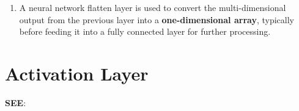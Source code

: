 \begin{enumerate}
    \item A neural network flatten layer is used to convert the multi-dimensional output from the previous layer into a \textbf{one-dimensional array}, typically before feeding it into a fully connected layer for further processing.

    
\end{enumerate}



\section{Activation Layer}
\textbf{SEE}: 
















































































